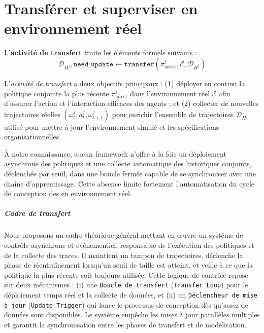 \chapter{Transférer et superviser en environnement réel}
\label{chap:transferring}

\noindent L'\textbf{activité de transfert} traite les éléments formels suivants :
\[
    \mathcal{D}_{H^j}, \texttt{need\_update} \gets \texttt{transfer}(\pi^j_{\text{latest}}, \mathcal{E}, \mathcal{D}_{H^j})
\]

L'\textit{activité de transfert} a deux objectifs principaux : (1) déployer en continu la politique conjointe la plus récente $\pi^j_{\text{latest}}$ dans l'environnement réel $\mathcal{E}$ afin d'assurer l'action et l'interaction efficaces des agents ; et (2) collecter de nouvelles trajectoires réelles $(\omega^j_t, a^j_t, \omega^j_{t+1})$ pour enrichir l'ensemble de trajectoires $\mathcal{D}_{H^j}$ utilisé pour mettre à jour l'environnement simulé et les spécifications organisationnelles.

À notre connaissance, aucun framework n'offre à la fois un déploiement asynchrone des politiques et une collecte automatique des historiques conjoints, déclenchée par seuil, dans une boucle fermée capable de se synchroniser avec une chaîne d'apprentissage. Cette absence limite fortement l'automatisation du cycle de conception des  en environnement réel.

\paragraph{Cadre de transfert}

Nous proposons un cadre théorique général mettant en œuvre un système de contrôle asynchrone et événementiel, responsable de l'exécution des politiques et de la collecte des traces. Il maintient un tampon de trajectoires, déclenche la phase de réentraînement lorsqu'un seuil de taille est atteint, et veille à ce que la politique la plus récente soit toujours utilisée. Cette logique de contrôle repose sur deux mécanismes :
(i) une \texttt{Boucle de transfert} (\texttt{Transfer Loop}) pour le déploiement temps réel et la collecte de données, et
(ii) un \texttt{Déclencheur de mise à jour} (\texttt{Update Trigger}) qui lance le processus de conception dès qu'assez de données sont disponibles. Le système empêche les mises à jour parallèles multiples et garantit la synchronisation entre les phases de transfert et de modélisation.

